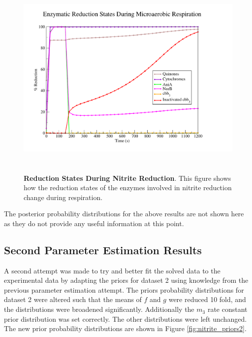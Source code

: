 \begin{figure}[tbp]
 \centering
 \includegraphics[height=10cm, trim=1cm 1cm 3cm 1cm, clip=true]{./07-nitritereduction/data/dataset2redox-1.pdf}
 \caption[Reduction States During Nitrite Reduction]{{\bf Reduction States During Nitrite Reduction}. This figure shows how the reduction states of the enzymes involved in nitrite reduction change during respiration.
  \label{fig:nitrite_ds2_redox1}}
\end{figure}

The posterior probability distributions for the above results are not shown here as they do not provide any useful information at this point.

\subsection{Second Parameter Estimation Results}
A second attempt was made to try and better fit the solved data to the experimental data by adapting the priors for dataset 2 using knowledge from the previous parameter estimation attempt. The priors probability distributions for dataset 2 were altered such that the means of $f$ and $g$ were reduced 10 fold, and the distributions were broadened significantly. Additionally the $m_3$ rate constant prior distribution was set correctly. The other distributions were left unchanged. The new prior probability distributions are shown in Figure \ref{fig:nitrite_priors2}.

